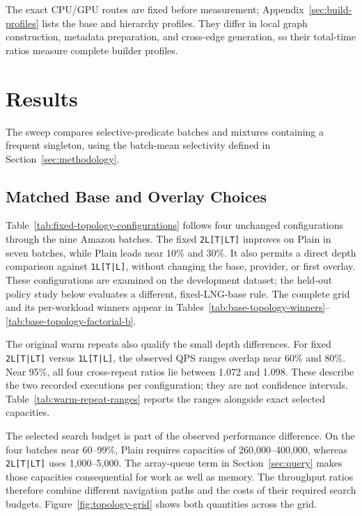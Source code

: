 The exact CPU/GPU routes are fixed before measurement; Appendix~\ref{sec:build-profiles}
lists the base and hierarchy profiles. They differ in local graph construction,
metadata preparation, and cross-edge generation, so their total-time ratios
measure complete builder profiles.

\section{Results}
The sweep compares selective-predicate batches and mixtures containing a
frequent singleton, using the batch-mean selectivity defined in Section~\ref{sec:methodology}.
\subsection{Matched Base and Overlay Choices}
\baseTopologyFixedConfigurations
Table~\ref{tab:fixed-topology-configurations} follows four unchanged
configurations through the nine Amazon batches. The fixed
\texttt{2L[T|LT]} improves on Plain in seven batches, while Plain leads
near 10\% and 30\%. It also permits a direct depth comparison against
\texttt{1L[T|L]}, without changing the base, provider, or first overlay.
These configurations are examined on the development dataset; the
held-out policy study below evaluates a different, fixed-LNG-base rule.
The complete grid and its per-workload winners appear in
Tables~\ref{tab:base-topology-winners}--\ref{tab:base-topology-factorial-b}.
\baseTopologyFactorialFindings

The original warm repeats also qualify the small depth differences.
For fixed \texttt{2L[T|LT]} versus \texttt{1L[T|L]}, the observed QPS ranges
overlap near 60\% and 80\%. Near 95\%, all four cross-repeat ratios lie
between 1.072 and 1.098. These describe the two recorded executions per
configuration; they are not confidence intervals. Table~\ref{tab:warm-repeat-ranges}
reports the ranges alongside exact selected capacities.

The selected search budget is part of the observed performance difference.
On the four batches near 60--99\%, Plain requires capacities of
260,000--400,000, whereas \texttt{2L[T|LT]} uses 1,000--5,000.
The array-queue term in Section~\ref{sec:query} makes those capacities
consequential for work as well as memory. The throughput ratios therefore
combine different navigation paths and the costs of their required search
budgets. Figure~\ref{fig:topology-grid} shows both quantities across the grid.

